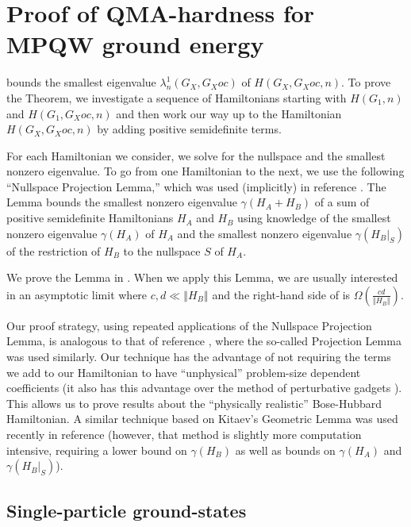 \documentclass[../thesis-main/thesis-main]{subfiles}
\begin{document}

\section{Proof of QMA-hardness for MPQW ground energy}

 bounds the smallest eigenvalue $\lambda_n^{1}(G_X,G_Xoc)$ of $H(G_X,G_Xoc,n)$. To prove the Theorem, we investigate a sequence of Hamiltonians starting with $H(G_{1},n)$ and $H(G_{1},G_Xoc,n)$ and then work our way up to the Hamiltonian $H(G_X,G_Xoc,n)$ by adding positive semidefinite terms.

For each Hamiltonian we consider, we solve for the nullspace and the smallest nonzero eigenvalue. To go from one Hamiltonian to the next, we use the following ``Nullspace Projection Lemma,'' which was used (implicitly) in reference \cite{MLM99}. The Lemma bounds the smallest nonzero eigenvalue $\gamma(H_A+H_B)$ of a sum of positive semidefinite Hamiltonians $H_A$ and $H_B$ using knowledge of the smallest nonzero eigenvalue $\gamma(H_A)$ of $H_A$ and the smallest nonzero eigenvalue $\gamma(H_B|_S)$ of the restriction of $H_B$ to the nullspace $S$ of $H_A$.

We prove the Lemma in . When we apply this Lemma, we are usually interested in an asymptotic limit where $c,d\ll\left\Vert H_{B}\right\Vert $ and the right-hand side of  is $\Omega(\frac{cd}{\Vert H_{B}\Vert })$.

Our proof strategy, using repeated applications of the Nullspace Projection Lemma, is analogous to that of reference \cite{KKR04}, where the so-called Projection Lemma was used similarly. Our technique has the advantage of not requiring the terms we add to our Hamiltonian to have ``unphysical'' problem-size dependent coefficients (it also has this advantage over the method of perturbative gadgets \cite{KKR04,JF08}). This allows us to prove results about the ``physically realistic'' Bose-Hubbard Hamiltonian. A similar technique based on Kitaev's Geometric Lemma was used recently in reference \cite{GN13} (however, that method is slightly more computation intensive, requiring a lower bound on $\gamma(H_{B})$ as well as bounds on $\gamma(H_{A})$ and $\gamma(H_{B}|_{S})$).


\subsection{Single-particle ground-states}
\end{document}
